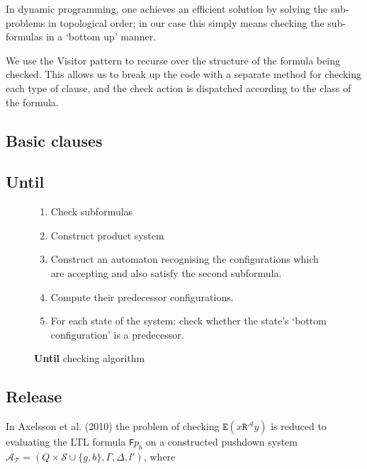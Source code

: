 \documentclass[11pt]{article}
\theoremstyle{definition}
\begin{document}
In dynamic programming, one achieves an efficient solution by solving the
sub-problems in topological order; in our case this simply means checking the
sub-formulas in a `bottom up' manner. 


We use the Visitor pattern to recurse over the structure of the formula being
checked. This allows us to break up the code with a separate method for
checking each type of clause, and the check action is dispatched according to
the class of the formula.



\subsection{Basic clauses}

\subsection{Until}

\begin{figure}[h!] %
\caption{\textbf{Until} checking algorithm}
\begin{enumerate}
\item{Check subformulas}

\item{Construct product system}

\item{Construct an automaton recognising the configurations which are accepting and also satisfy the second subformula.}

\item{Compute their predecessor configurations.}

\item{For each state of the system:
   check whether the state's `bottom configuration' is a predecessor.}
   \end{enumerate}
\end{figure}

\subsection{Release}


In Axelsson et al. (2010) the problem of checking
$\texttt{E}(x\texttt{R}^\mathcal{A}y)$ is reduced to evaluating the LTL formula
\texttt{F}$p_b$ on a constructed pushdown system $\mathcal{A}_\mathcal{T} = (Q
\times \mathcal{S} \cup \{g, b\}, \Gamma, \Delta, l')$, where 
\end{document}
